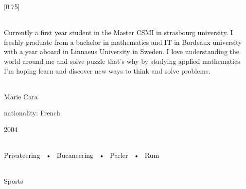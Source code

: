 \documentclass[lighthipster]{simplehipstercv}
\begin{document}
\setlength{\columnsep}{1.5cm}
[0.75]
\begin{paracol}{2}

\paracolbackgroundoptions



\footnotesize
{\setasidefontcolour
\flushright
\begin{center}
\end{center}

\\[0.5em]

{\footnotesize
Currently a first year student in the Master CSMI in strasbourg university.
 I freshly graduate from a bachelor in mathematics and IT in Bordeaux university with a year aboard in Linnaeus University in Sweden.
 I love understanding the world around me and solve puzzle that's why by studying applied mathematics I'm hoping learn and discover
 new ways to think and solve problems.
 }
\bigskip

 \\[0.5em]
Marie Cara

nationality: French 

2004

\bigskip

 \\[0.5em]

Privateering ~•~ Bucaneering ~•~ Parler ~•~ Rum

\bigskip



\bigskip

\\[0.5em]
Sports


\bigskip

\vspace{4em}


\phantom{turn the page}

\phantom{turn the page}
}
\switchcolumn


\end{paracol}
\end{document}
